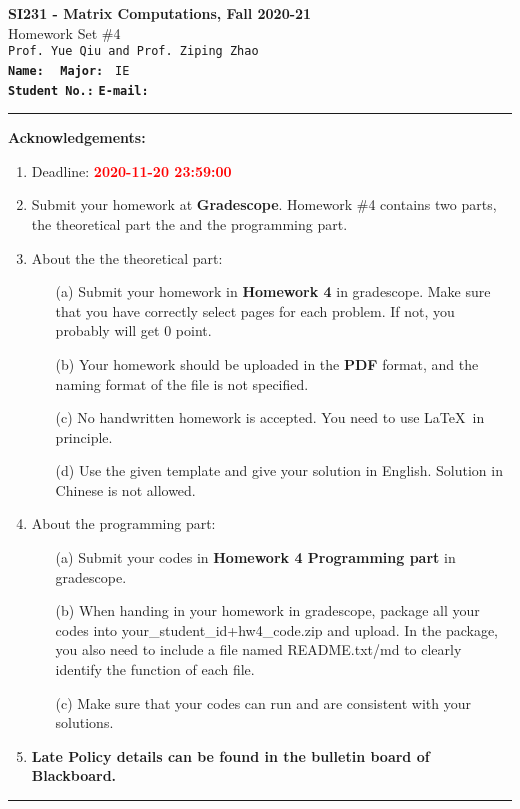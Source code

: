 \documentclass[english,onecolumn]{IEEEtran}
\begin{document}
\begin{center}
	\textbf{\LARGE{SI231 - Matrix Computations, Fall 2020-21}}\\
	{\Large Homework Set \#4}\\
	\texttt{Prof. Yue Qiu and Prof. Ziping Zhao}\\
	\texttt{\textbf{Name:}}   	\texttt{  }  		\hspace{1bp}
	\texttt{\textbf{Major:}}  	\texttt{ IE } 	\\
	\texttt{\textbf{Student No.:}} 	\texttt{}     \hspace{1bp}
	\texttt{\textbf{E-mail:}} 	\texttt{}
\par\end{center}

\noindent
\rule{\linewidth}{0.4pt}
{\bf {\large Acknowledgements:}}
\begin{enumerate}
    \item Deadline: \textcolor{red}{\textbf{2020-11-20 23:59:00}}
    \item Submit your homework at \textbf{Gradescope}.
    Homework \#4 contains two parts, the theoretical part the and the programming part.
    \item About the the theoretical part:
    \begin{enumerate}
            \item[(a)] Submit your homework in \textbf{Homework 4} in gradescope. Make sure that you have correctly select pages for each problem. If not, you probably will get 0 point.
            \item[(b)] Your homework should be uploaded in the \textbf{PDF} format, and the naming format of the file is not specified.
            \item[(c)] No handwritten homework is accepted. You need to use \LaTeX $\,$ in principle.
            \item[(d)] Use the given template and give your solution in English. Solution in Chinese is not allowed. 
        \end{enumerate}
  \item About the programming part:
  \begin{enumerate}
      \item[(a)] Submit your codes in \textbf{Homework 4 Programming part} in gradescope. 
      \item[(b)] When handing in your homework in gradescope, package all your codes into {\sf your\_student\_id+hw4\_code.zip} and upload. In the package, you also need to include a file named {\sf README.txt/md} to clearly identify the function of each file.
     \item[(c)] Make sure that your codes can run and are consistent with your solutions.
  \end{enumerate}
  \item \textbf{Late Policy details can be found in the bulletin board of Blackboard.}
\end{enumerate}
\rule{\linewidth}{0.4pt}
\end{document}
